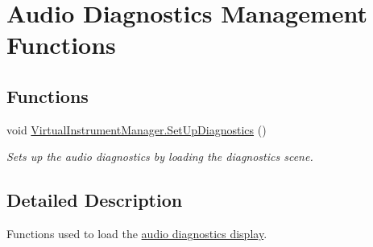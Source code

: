 \hypertarget{group___v_i_m_diag_func}{}\section{Audio Diagnostics Management Functions}
\label{group___v_i_m_diag_func}
\subsection*{Functions}
\begin{DoxyCompactItemize}
\item 
\mbox{\label{group___v_i_m_diag_func_ga3d7a09ee882f5d4d1f1e2ba2b2a7f65d}} 
void \hyperlink{group___v_i_m_diag_func_ga3d7a09ee882f5d4d1f1e2ba2b2a7f65d}{Virtual\+Instrument\+Manager.\+Set\+Up\+Diagnostics} ()
\begin{DoxyCompactList}\small\item\em Sets up the audio diagnostics by loading the diagnostics scene. \end{DoxyCompactList}\end{DoxyCompactItemize}


\subsection{Detailed Description}
Functions used to load the \hyperlink{group___audio_testing_class_a_t_i___diagnostics}{audio diagnostics display}. 